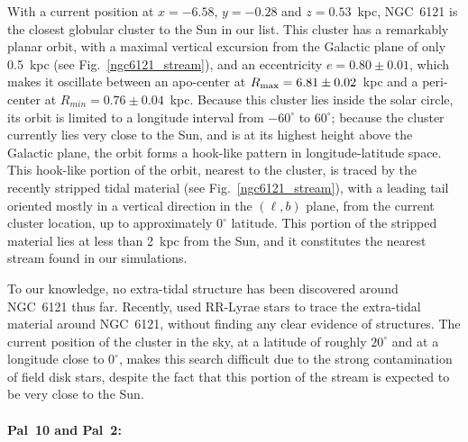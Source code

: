             With a current position at $x=-6.58$, $y=-0.28$ and $z=0.53$~kpc, NGC~6121 is the closest globular cluster to the Sun in our list. This cluster has a  remarkably planar orbit, with a maximal vertical excursion from the Galactic plane of only 0.5~kpc (see  Fig.~\ref{ngc6121_stream}), and an eccentricity $e=0.80 \pm 0.01$, which makes it oscillate between an apo-center at $R_{\rm max}=6.81 \pm 0.02$~kpc and a peri-center at $R_{min}=0.76 \pm 0.04$~kpc. Because this cluster lies inside the solar circle, its orbit is limited to a longitude interval from $-60^{\circ}$ to $60^{\circ}$; because the cluster currently lies very close to the Sun, and is at its highest height above the Galactic plane, the orbit forms a hook-like pattern in longitude-latitude space. This hook-like portion of the orbit, nearest to the cluster, is traced by the recently stripped tidal material (see Fig.~\ref{ngc6121_stream}), with a leading tail oriented mostly in a vertical direction in the $(\ell,b)$ plane, from the current cluster location, up to approximately $0^\circ$ latitude. This portion of the stripped material lies at less than 2~kpc from the Sun, and it constitutes the nearest stream found in our simulations.

            To our knowledge, no extra-tidal structure has been discovered  around NGC~6121 thus far. Recently, \citet{2019MNRAS.483.1737K} used RR-Lyrae stars to trace the extra-tidal material around NGC~6121, without finding any clear evidence of structures. The current position of the cluster in the sky, at a latitude of roughly $20^\circ$ and at a longitude close to $0^\circ$, makes this search  difficult due to the strong contamination of field disk stars, despite the fact that this portion of the stream is expected to be very close to the Sun.

            \paragraph{Pal~10 and Pal~2: }

